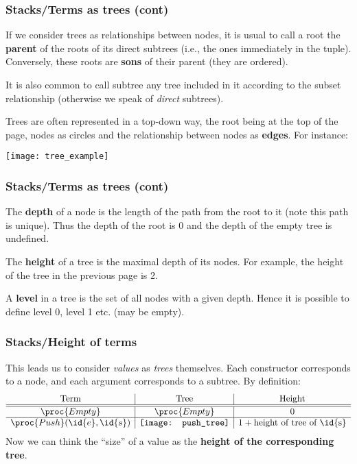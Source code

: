 %
\begin{frame}
\frametitle{Stacks/Terms as trees (cont)}

If we consider trees as relationships between nodes, it is usual to
call a root the \textbf{parent} of the roots of its direct subtrees
(i.e., the ones immediately in the tuple). Conversely, these roots are
\textbf{sons} of their parent (they are ordered).

It is also common to call subtree any tree included in it according to
the subset relationship (otherwise we speak of \emph{direct} subtrees).

Trees are often represented in a top-down way, the root being at the
top of the page, nodes as circles and the relationship between nodes
as \textbf{edges}. For instance:

\begin{center}
\texttt{[image: tree\_example]}
\end{center}

\end{frame}

%
\begin{frame}
\frametitle{Stacks/Terms as trees (cont)}

The \textbf{depth} of a node is the length of the path from the root
to it (note this path is unique). Thus the depth of the root is 0 and
the depth of the empty tree is undefined.

\bigskip

The \textbf{height} of a tree is the maximal depth of its nodes. For
example, the height of the tree in the previous page is 2.

\bigskip

A \textbf{level} in a tree is the set of all nodes with a given
depth. Hence it is possible to define level 0, level 1 etc. (may be
empty).

\end{frame}

%
\begin{frame}
\frametitle{Stacks/Height of terms}

This leads us to consider \emph{values} as \emph{trees}
themselves. Each constructor corresponds to a node, and each argument
corresponds to a subtree. By definition:
\[
\begin{array}{c|c|c}
  \text{Term}
& \text{Tree}
& \text{Height}\\
\hline\hline
  \proc{Empty} 
& \proc{Empty}
& 0\\
\hline
  \proc{Push} (\id{e}, \id{s})
& \texttt{[image: push\_tree]}
& 1 + \text{height of tree of \id{s}}
\end{array}
\]
Now we can think the ``size'' of a value as the \textbf{height of the
corresponding tree}.

\end{frame}

